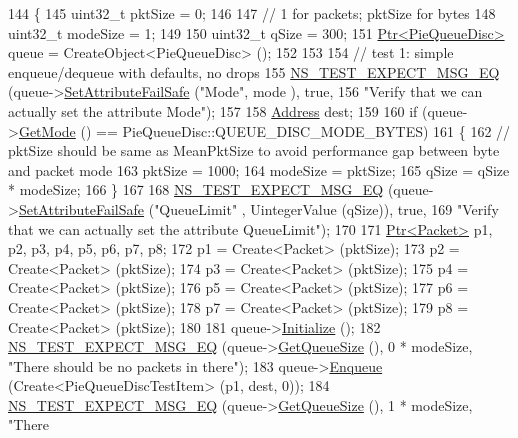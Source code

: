 \begin{DoxyCode}
144 \{
145   uint32\_t pktSize = 0;
146 
147   \textcolor{comment}{// 1 for packets; pktSize for bytes}
148   uint32\_t modeSize = 1;
149 
150   uint32\_t qSize = 300;
151   \hyperlink{classns3_1_1Ptr}{Ptr<PieQueueDisc>} queue = CreateObject<PieQueueDisc> ();
152 
153 
154   \textcolor{comment}{// test 1: simple enqueue/dequeue with defaults, no drops}
155   \hyperlink{group__testing_ga7304ba46a28d8cf08dfdfd6499cf7068}{NS\_TEST\_EXPECT\_MSG\_EQ} (queue->\hyperlink{classns3_1_1ObjectBase_aa7d333004e970f925a4ed5df275541b5}{SetAttributeFailSafe} (\textcolor{stringliteral}{"Mode"}, mode
      ), \textcolor{keyword}{true},
156                          \textcolor{stringliteral}{"Verify that we can actually set the attribute Mode"});
157 
158   \hyperlink{classns3_1_1Address}{Address} dest;
159 
160   \textcolor{keywordflow}{if} (queue->\hyperlink{classns3_1_1PieQueueDisc_a13bb54f830216e6d8e114abe3b4b04be}{GetMode} () == PieQueueDisc::QUEUE\_DISC\_MODE\_BYTES)
161     \{
162       \textcolor{comment}{// pktSize should be same as MeanPktSize to avoid performance gap between byte and packet mode}
163       pktSize = 1000;
164       modeSize = pktSize;
165       qSize = qSize * modeSize;
166     \}
167 
168   \hyperlink{group__testing_ga7304ba46a28d8cf08dfdfd6499cf7068}{NS\_TEST\_EXPECT\_MSG\_EQ} (queue->\hyperlink{classns3_1_1ObjectBase_aa7d333004e970f925a4ed5df275541b5}{SetAttributeFailSafe} (\textcolor{stringliteral}{"QueueLimit"}
      , UintegerValue (qSize)), \textcolor{keyword}{true},
169                          \textcolor{stringliteral}{"Verify that we can actually set the attribute QueueLimit"});
170 
171   \hyperlink{classns3_1_1Ptr}{Ptr<Packet>} p1, p2, p3, p4, p5, p6, p7, p8;
172   p1 = Create<Packet> (pktSize);
173   p2 = Create<Packet> (pktSize);
174   p3 = Create<Packet> (pktSize);
175   p4 = Create<Packet> (pktSize);
176   p5 = Create<Packet> (pktSize);
177   p6 = Create<Packet> (pktSize);
178   p7 = Create<Packet> (pktSize);
179   p8 = Create<Packet> (pktSize);
180 
181   queue->\hyperlink{classns3_1_1Object_af4411cb29971772fcd09203474a95078}{Initialize} ();
182   \hyperlink{group__testing_ga7304ba46a28d8cf08dfdfd6499cf7068}{NS\_TEST\_EXPECT\_MSG\_EQ} (queue->\hyperlink{classns3_1_1PieQueueDisc_ae8675ca8d1c18d43ca678f30040e8510}{GetQueueSize} (), 0 * modeSize, \textcolor{stringliteral}{"There
       should be no packets in there"});
183   queue->\hyperlink{classns3_1_1QueueDisc_af452fb01b98fed312125163f1fe85431}{Enqueue} (Create<PieQueueDiscTestItem> (p1, dest, 0));
184   \hyperlink{group__testing_ga7304ba46a28d8cf08dfdfd6499cf7068}{NS\_TEST\_EXPECT\_MSG\_EQ} (queue->\hyperlink{classns3_1_1PieQueueDisc_ae8675ca8d1c18d43ca678f30040e8510}{GetQueueSize} (), 1 * modeSize, \textcolor{stringliteral}{"There
}
\end{DoxyCode}
